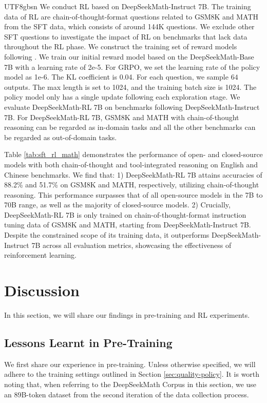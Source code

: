 \documentclass[11pt, a4paper, logo, copyright, nonumbering]{deepseek}
\newcommand{\spmath}{DeepSeekMath}
\begin{document}
\begin{CJK*}{UTF8}{gbsn}
We conduct RL based on \spmath-Instruct 7B.
The training data of RL are chain-of-thought-format questions related to GSM8K and MATH from the SFT data, which consists of around 144K questions. 
We exclude other SFT questions to investigate the impact of RL on benchmarks that lack data throughout the RL phase.
We construct the training set of reward models following \citep{wang2023math}.
We train our initial reward model based on the \spmath-Base 7B with a learning rate of 2e-5.
For GRPO, we set the learning rate of the policy model as 1e-6. The KL coefficient is 0.04. For each question, we sample $64$ outputs.  The max length is set to 1024, and the training batch size is 1024.
The policy model only has a single update following each
exploration stage.
We evaluate \spmath-RL 7B on benchmarks following \spmath-Instruct 7B.
For \spmath-RL 7B, GSM8K and MATH with chain-of-thought reasoning can be regarded as in-domain tasks and all the other benchmarks can be regarded as out-of-domain tasks.

Table \ref{tab:sft_rl_math} demonstrates the performance of open- and closed-source models with both chain-of-thought and tool-integrated reasoning on English and Chinese benchmarks. We find that:
1) \spmath-RL 7B attains accuracies of 88.2\% and 51.7\% on GSM8K and MATH, respectively, utilizing chain-of-thought reasoning. This performance surpasses that of all open-source models in the 7B to 70B range, as well as the majority of closed-source models. 
2) Crucially, \spmath-RL 7B is only trained on chain-of-thought-format instruction tuning data of GSM8K and MATH, starting from \spmath-Instruct 7B. Despite the constrained scope of its training data, it outperforms \spmath-Instruct 7B across all evaluation metrics, showcasing the effectiveness of reinforcement learning.

\section{Discussion}
In this section, we will share our findings in pre-training and RL experiments. 

\subsection{Lessons Learnt in Pre-Training}

We first share our experience in pre-training. Unless otherwise specified, we will adhere to the training settings outlined in Section \ref{sec:quality-policy}. It is worth noting that, when referring to the DeepSeekMath Corpus in this section, we use an 89B-token dataset from the second iteration of the data collection process.


\end{CJK*}
\end{document}
